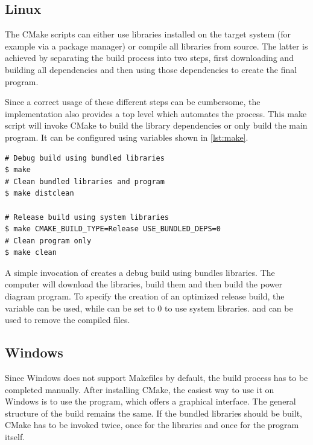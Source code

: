 \subsection{Linux}
\label{sub:linux}
The CMake scripts can either use libraries installed on the target system (for example via a package manager) or compile all libraries from source.
The latter is achieved by separating the build process into two steps, first downloading and building all dependencies and then using those dependencies to create the final program.

Since a correct usage of these different steps can be cumbersome, the implementation also provides a top level  which automates the process.
This make script will invoke CMake to build the library dependencies or only build the main program.
It can be configured using variables shown in \cref{lst:make}.
\begin{listing}[tb]
    \begin{verbatim}
# Debug build using bundled libraries
$ make
# Clean bundled libraries and program
$ make distclean

# Release build using system libraries
$ make CMAKE_BUILD_TYPE=Release USE_BUNDLED_DEPS=0
# Clean program only
$ make clean
    \end{verbatim}
    \caption{A simple invocation of  creates a debug build using bundles libraries.
    The computer will download the libraries, build them and then build the power diagram program.
    To specify the creation of an optimized release build, the variable  can be used, while  can be set to 0 to use system libraries.
     and  can be used to remove the compiled files.
    }
    \label{lst:make}
\end{listing}

\subsection{Windows}
\label{sub:windows}
Since Windows does not support Makefiles by default, the build process has to be completed manually.
After installing CMake, the easiest way to use it on Windows is to use the  program, which offers a graphical interface.
The general structure of the build remains the same.
If the bundled libraries should be built, CMake has to be invoked twice, once for the libraries and once for the program itself.

